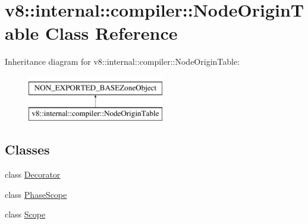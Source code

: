 \hypertarget{classv8_1_1internal_1_1compiler_1_1NodeOriginTable}{}\section{v8\+:\+:internal\+:\+:compiler\+:\+:Node\+Origin\+Table Class Reference}
\label{classv8_1_1internal_1_1compiler_1_1NodeOriginTable}
Inheritance diagram for v8\+:\+:internal\+:\+:compiler\+:\+:Node\+Origin\+Table\+:\begin{figure}[H]
\begin{center}
\leavevmode
\includegraphics[height=2.000000cm]{classv8_1_1internal_1_1compiler_1_1NodeOriginTable}
\end{center}
\end{figure}
\subsection*{Classes}
\begin{DoxyCompactItemize}
\item 
class \mbox{\hyperlink{classv8_1_1internal_1_1compiler_1_1NodeOriginTable_1_1Decorator}{Decorator}}
\item 
class \mbox{\hyperlink{classv8_1_1internal_1_1compiler_1_1NodeOriginTable_1_1PhaseScope}{Phase\+Scope}}
\item 
class \mbox{\hyperlink{classv8_1_1internal_1_1compiler_1_1NodeOriginTable_1_1Scope}{Scope}}
\end{DoxyCompactItemize}
